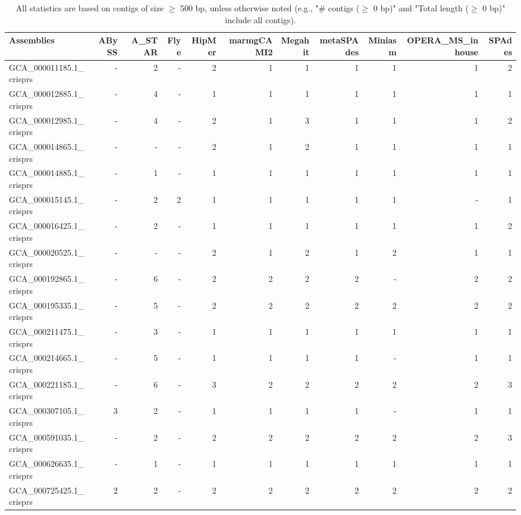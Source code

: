 \documentclass[12pt,a4paper]{article}
\begin{document}
\begin{table}[ht]
\begin{center}
\caption{All statistics are based on contigs of size $\geq$ 500 bp, unless otherwise noted (e.g., "\# contigs ($\geq$ 0 bp)" and "Total length ($\geq$ 0 bp)" include all contigs).}
\begin{tabular}{|l*{10}{|r}|}
\hline
Assemblies & ABySS & A\_STAR & Flye & HipMer & marmgCAMI2 & Megahit & metaSPAdes & Miniasm & OPERA\_MS\_inhouse & SPAdes \\ \hline
GCA\_000011185.1\_crisprs & - & 2 & - & 2 & 1 & 1 & 1 & 1 & 1 & 2 \\ \hline
GCA\_000012885.1\_crisprs & - & 4 & - & 1 & 1 & 1 & 1 & 1 & 1 & 1 \\ \hline
GCA\_000012985.1\_crisprs & - & 4 & - & 2 & 1 & 3 & 1 & 1 & 1 & 2 \\ \hline
GCA\_000014865.1\_crisprs & - & - & - & 2 & 1 & 2 & 1 & 1 & 1 & 1 \\ \hline
GCA\_000014885.1\_crisprs & - & 1 & - & 1 & 1 & 1 & 1 & 1 & 1 & 1 \\ \hline
GCA\_000015145.1\_crisprs & - & 2 & 2 & 1 & 1 & 1 & 1 & 1 & - & 1 \\ \hline
GCA\_000016425.1\_crisprs & - & 2 & - & 1 & 1 & 1 & 1 & 1 & 1 & 2 \\ \hline
GCA\_000020525.1\_crisprs & - & - & - & 2 & 1 & 2 & 1 & 2 & 1 & 1 \\ \hline
GCA\_000192865.1\_crisprs & - & 6 & - & 2 & 2 & 2 & 2 & - & 2 & 2 \\ \hline
GCA\_000195335.1\_crisprs & - & 5 & - & 2 & 2 & 2 & 2 & 2 & 2 & 2 \\ \hline
GCA\_000211475.1\_crisprs & - & 3 & - & 1 & 1 & 1 & 1 & 1 & 1 & 1 \\ \hline
GCA\_000214665.1\_crisprs & - & 5 & - & 1 & 1 & 1 & 1 & - & 1 & 1 \\ \hline
GCA\_000221185.1\_crisprs & - & 6 & - & 3 & 2 & 2 & 2 & 2 & 2 & 3 \\ \hline
GCA\_000307105.1\_crisprs & 3 & 2 & - & 1 & 1 & 1 & 1 & - & 1 & 1 \\ \hline
GCA\_000591035.1\_crisprs & - & 2 & - & 2 & 2 & 2 & 2 & 2 & 2 & 3 \\ \hline
GCA\_000626635.1\_crisprs & - & 1 & - & 1 & 1 & 1 & 1 & 1 & 1 & 1 \\ \hline
GCA\_000725425.1\_crisprs & 2 & 2 & - & 2 & 2 & 2 & 2 & 2 & 2 & 2 \\ \hline
\end{tabular}
\end{center}
\end{table}
\end{document}
